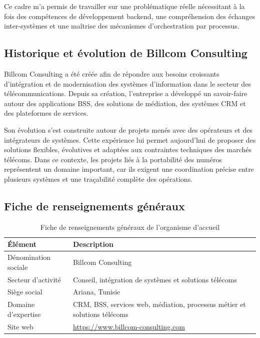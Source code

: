 \documentclass[12pt,a4paper]{report}
\begin{document}
Ce cadre m'a permis de travailler sur une problématique réelle nécessitant à la fois des compétences de développement backend, une compréhension des échanges inter-systèmes et une maîtrise des mécanismes d'orchestration par processus.

\subsection{Historique et évolution de Billcom Consulting}
Billcom Consulting a été créée afin de répondre aux besoins croissants d'intégration et de modernisation des systèmes d'information dans le secteur des télécommunications. Depuis sa création, l'entreprise a développé un savoir-faire autour des applications BSS, des solutions de médiation, des systèmes CRM et des plateformes de services.

Son évolution s'est construite autour de projets menés avec des opérateurs et des intégrateurs de systèmes. Cette expérience lui permet aujourd'hui de proposer des solutions flexibles, évolutives et adaptées aux contraintes techniques des marchés télécoms. Dans ce contexte, les projets liés à la portabilité des numéros représentent un domaine important, car ils exigent une coordination précise entre plusieurs systèmes et une traçabilité complète des opérations.

\subsection{Fiche de renseignements généraux}
\begin{table}[h]
    \centering
    \begin{tabular}{p{5cm}p{8cm}}
        \toprule
        \textbf{Élément} & \textbf{Description} \\
        \midrule
        Dénomination sociale & Billcom Consulting \\
        Secteur d'activité & Conseil, intégration de systèmes et solutions télécoms \\
        Siège social & Ariana, Tunisie \\
        Domaine d'expertise & CRM, BSS, services web, médiation, processus métier et solutions télécoms \\
        Site web & \url{https://www.billcom-consulting.com} \\
        \bottomrule
    \end{tabular}
    \caption{Fiche de renseignements généraux de l'organisme d'accueil}
\end{table}
\end{document}

